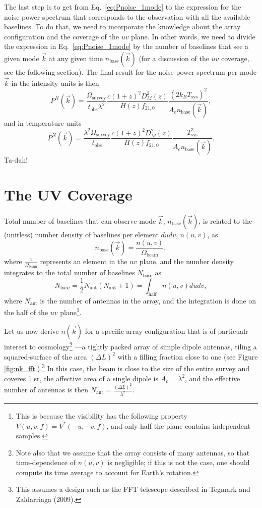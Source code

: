 \documentclass[12pt]{paper}
\newcommand{\beq}{\begin{equation}}
\newcommand{\eeq}{\end{equation}}
\begin{document}
The last step is to get from Eq.~\ref{eq:Pnoise_1mode} to the expression for the noise power spectrum that corresponds to the observation with all the available baselines. To do that, we need to incorporate the knowledge about the array configuration and the coverage of the $uv$ plane. In other words, we need to divide the expression in Eq.~\ref{eq:Pnoise_1mode} by the number of baselines that see a given mode $\vec k$ at any given time $n_\text{base}(\vec k)$ (for a discussion of the $uv$ coverage, see the following section). The final result for the noise power spectrum per mode $\vec k$ in the intensity units is then
\beq
P^N(\vec k) = \frac{\Omega_\text{survey}}{t_\text{obs}\lambda^2}\frac{c(1+z)^2D_M^2(z)}{H(z)f_{21,0}}\frac{\left(2k_BT_\text{sys}\right)^2}{A_en_\text{base}(\vec k)},
\label{eq:Pnoise_Jy}
\eeq
and in temperature units
\beq
P^N(\vec k) = \frac{\lambda^2\Omega_\text{survey}}{t_\text{obs}}\frac{c(1+z)^2D_M^2(z)}{H(z)f_{21,0}}\frac{T_\text{sys}^2}{A_en_\text{base}(\vec k)}.
\label{eq:Pnoise_K}
\eeq
Ta-dah!
\section{The UV Coverage}
\label{sec:uv_coverage}

Total number of baselines that can observe mode $\vec k$, $n_\text{base}(\vec k)$, is related to the (unitless) number density of baselines per element $dudv$, $n(u,v)$, as
\beq
n_\text{base}(\vec k) = \frac{n(u,v)}{\Omega_\text{beam}},
\label{eq:nuv_nk}
\eeq
where $\frac{1}{\Omega_\text{beam}}$ represents an element in the $uv$ plane, and the number density integrates to the total number of baselines $N_\text{base}$ as 
\beq
N_\text{base}=\frac{1}{2}N_\text{ant}(N_\text{ant}+1) = \int_\text{half} n(u,v)dudv,
\label{eq:nk}
\eeq
where $N_\text{ant}$ is the number of antennas in the array, and the integration is done on the half of the $uv$ plane\footnote{This is because the visibility has the following property $V(u,v,f)=V^*(-u,-v,f)$, and only half the plane contains independent samples.}.

Let us now derive $n(\vec k)$ for a specific array configuration that is of particualr interest to cosmology\footnote{Note also that we assume that the array consists of many antennas, so that time-dependence of $n(u,v)$ is negligible; if this is not the case, one should compute its time average to account for Earth's rotation.} ---a tightly packed array of simple dipole antennas, tiling a squared-surface of the area $(\Delta L)^2$ with a filling fraction close to one (see Figure \ref{fig:nk_fft}).\footnote{This assumes a design such as the FFT telescope described in Tegmark and Zaldarriaga (2009).} In this case, the beam is close to the size of the entire survey and coveres 1 sr, the affective area of a single dipole is $A_e = \lambda^2$, and the effective number of antennas is then $N_\text{ant} = \frac{(\Delta L)^2}{\lambda^2}$.
\end{document}
